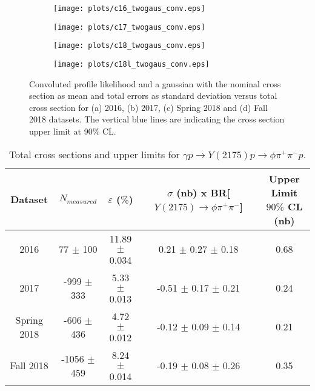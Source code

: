 \begin{figure}[H]
    \centering
    \begin{subfigure}[b]{0.49\textwidth}
        \texttt{[image: plots/c16\_twogaus\_conv.eps]}
        \caption{}
        \label{fig.y2175.xsec_ul.yphi2pi.7.a}
    \end{subfigure}
    \begin{subfigure}[b]{0.49\textwidth}
        \texttt{[image: plots/c17\_twogaus\_conv.eps]}
        \caption{}
        \label{fig.y2175.xsec_ul.yphi2pi.7.b}
    \end{subfigure}
    \begin{subfigure}[b]{0.49\textwidth}
        \texttt{[image: plots/c18\_twogaus\_conv.eps]}
        \caption{}
        \label{fig.y2175.xsec_ul.yphi2pi.7.c}
    \end{subfigure}
    \begin{subfigure}[b]{0.49\textwidth}
        \texttt{[image: plots/c18l\_twogaus\_conv.eps]}
        \caption{}
        \label{fig.y2175.xsec_ul.yphi2pi.7.d}
    \end{subfigure}
    \caption{Convoluted profile likelihood and a gaussian with the nominal cross section as mean and total errors as standard deviation versus total cross section for (a) 2016, (b) 2017, (c) Spring 2018 and (d) Fall 2018 datasets. The vertical blue lines are indicating the cross section upper limit at 90$\%$ CL.}
    \label{fig.y2175.xsec_ul.yphi2pi.7}
\end{figure}

\begin{table}[!htbp]
    \small
    \centering
    \caption{Total cross sections and upper limits for $\gamma p \rightarrow Y(2175) p \rightarrow \phi \pi^{+} \pi^{-} p$.}
    \label{tab.y2175.xsec_ul.yphi2pi.1}
    \begin{tabular}{|c|c|c|c|c|}
        \hline
        Dataset & $N_{measured}$ & $\varepsilon$ ($\%$) & \thead{$\sigma$ (nb) x\\BR[$Y(2175) \rightarrow \phi \pi^{+} \pi^{-}$]} & \thead{Upper Limit\\$90\%$ CL (nb)} \\
        \hline
        2016 & 77 $\pm$ 100 & 11.89 $\pm$ 0.034 & 0.21 $\pm$ 0.27 $\pm$ 0.18 & 0.68 \\
        2017 & -999 $\pm$ 333 & 5.33 $\pm$ 0.013 & -0.51 $\pm$ 0.17 $\pm$ 0.21 & 0.24 \\
        Spring 2018 & -606 $\pm$ 436 & 4.72 $\pm$ 0.012 & -0.12 $\pm$ 0.09 $\pm$ 0.14 & 0.21 \\
        Fall 2018 & -1056 $\pm$ 459 & 8.24 $\pm$ 0.014 & -0.19 $\pm$ 0.08 $\pm$ 0.26 & 0.35 \\
        \hline
    \end{tabular}
\end{table}

